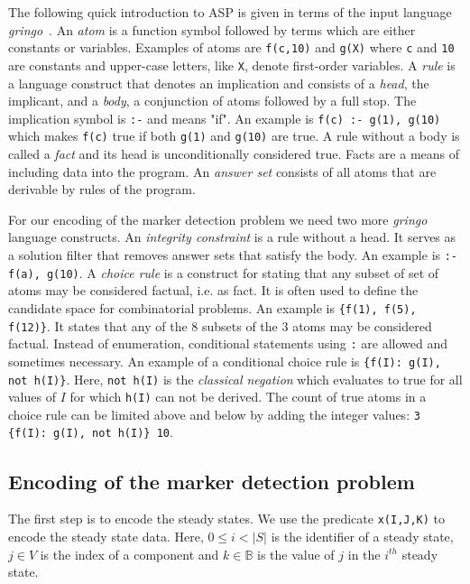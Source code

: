 \documentclass[11pt]{article}
\begin{document}
    The following quick introduction to ASP is given in terms of the input language \emph{gringo}~\cite{gebser2012answer}.
    An \emph{atom} is a function symbol followed by terms which are either constants or variables.
    Examples of atoms are \verb+f(c,10)+ and \verb+g(X)+ where \verb+c+ and \verb+10+ are constants and upper-case letters, like \verb+X+, denote first-order variables.
    A \emph{rule} is a language construct that denotes an implication and consists of a \emph{head}, the implicant, and a \emph{body}, a conjunction of atoms followed by a full stop.
    The implication symbol is \verb+:-+ and means "if".
    An example is \verb+f(c) :- g(1), g(10)+ which makes \verb+f(c)+ true if both \verb+g(1)+ and \verb+g(10)+ are true.
    A rule without a body is called a \emph{fact} and its head is unconditionally considered true.
    Facts are a means of including data into the program.
    An \emph{answer set} consists of all atoms that are derivable by rules of the program.

    For our encoding of the marker detection problem we need two more \emph{gringo} language constructs.
    An \emph{integrity constraint} is a rule without a head.
    It serves as a solution filter that removes answer sets that satisfy the body.
    An example is \verb+:- f(a), g(10)+.
    A \emph{choice rule} is a construct for stating that any subset of set of atoms may be considered factual, i.e. as fact.
    It is often used to define the candidate space for combinatorial problems.
    An example is \verb+{f(1), f(5), f(12)}+.
    It states that any of the 8 subsets of the 3 atoms may be considered factual.
    Instead of enumeration, conditional statements using \verb+:+ are allowed and sometimes necessary.
    An example of a conditional choice rule is \verb+{f(I): g(I), not h(I)}+.
    Here, \verb+not h(I)+ is the \emph{classical negation} which evaluates to true for all values of $I$ for which \verb+h(I)+ can not be derived.
    The count of true atoms in a choice rule can be limited above and below by adding the integer values: \verb+3 {f(I): g(I), not h(I)} 10+.

    \subsection{Encoding of the marker detection problem}
    The first step is to encode the steady states.
    We use the predicate \verb+x(I,J,K)+ to encode the steady state data.
    Here, $0 \leq i < |S|$ is the identifier of a steady state, $j \in V$ is the index of a component and $k \in \mathbb B$ is the value of $j$ in the $i^{th}$ steady state.
\end{document}
